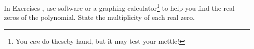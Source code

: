 {\noindent In Exercises}
{, use software or a graphing calculator\footnote{You \textit{can} do theseby hand, but it may test your mettle!} to help you find the real zeros of the polynomial.  State the multiplicity of each real zero.}
